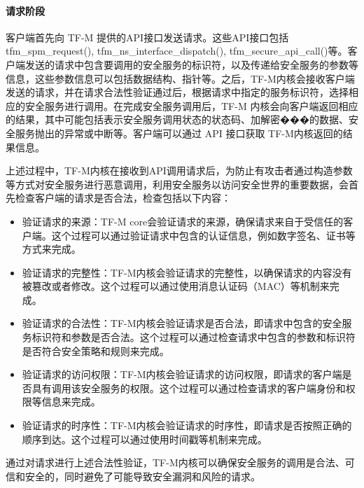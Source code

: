 \documentclass[12pt,a4paper]{ctexart}
\numberwithin{figure}{section}
\begin{document}
\paragraph{请求阶段}
\par 客户端首先向 TF-M 提供的API接口发送请求。这些API接口包括tfm\_spm\_request(), tfm\_ns\_interface\_dispatch(), tfm\_secure\_api\_call()等。客户端发送的请求中包含要调用的安全服务的标识符，以及传递给安全服务的参数等信息，这些参数信息可以包括数据结构、指针等。之后，TF-M内核会接收客户端发送的请求，并在请求合法性验证通过后，根据请求中指定的服务标识符，选择相应的安全服务进行调用。在完成安全服务调用后，TF-M 内核会向客户端返回相应的结果，其中可能包括表示安全服务调用状态的状态码、加解密���的数据、安全服务抛出的异常或中断等。客户端可以通过 API 接口获取 TF-M内核返回的结果信息。
\par 上述过程中，TF-M内核在接收到API调用请求后，为防止有攻击者通过构造参数等方式对安全服务进行恶意调用，利用安全服务以访问安全世界的重要数据，会首先检查客户端的请求是否合法，检查包括以下内容：
\begin{itemize}
    \item 验证请求的来源：TF-M core会验证请求的来源，确保请求来自于受信任的客户端。这个过程可以通过验证请求中包含的认证信息，例如数字签名、证书等方式来完成。
    \item 验证请求的完整性：TF-M内核会验证请求的完整性，以确保请求的内容没有被篡改或者修改。这个过程可以通过使用消息认证码（MAC）等机制来完成。
    \item  验证请求的合法性：TF-M内核会验证请求是否合法，即请求中包含的安全服务标识符和参数是否合法。这个过程可以通过检查请求中包含的参数和标识符是否符合安全策略和规则来完成。
    \item  验证请求的访问权限：TF-M内核会验证请求的访问权限，即请求的客户端是否具有调用该安全服务的权限。这个过程可以通过检查请求的客户端身份和权限等信息来完成。
    \item  验证请求的时序性：TF-M内核会验证请求的时序性，即请求是否按照正确的顺序到达。这个过程可以通过使用时间戳等机制来完成。
\end{itemize}
\par 通过对请求进行上述合法性验证，TF-M内核可以确保安全服务的调用是合法、可信和安全的，同时避免了可能导致安全漏洞和风险的请求。
\end{document}
